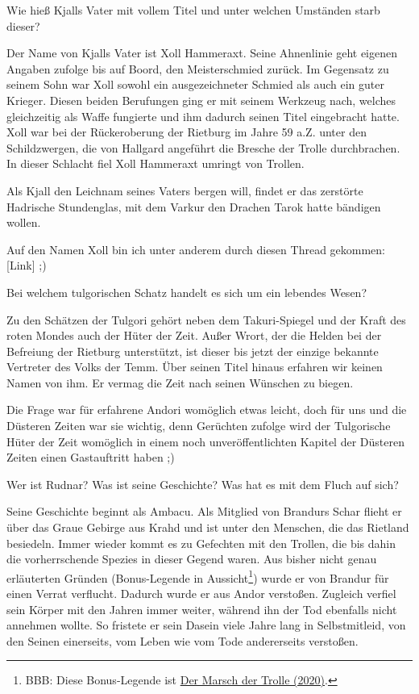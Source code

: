 \documentclass[10pt, a4paper, oneside]{book}
\newcommand{\reflegende}[1]{\hyperref[Legende: #1]{#1}}
\begin{document}
\begin{multicols}{2}
Wie hieß Kjalls Vater mit vollem Titel und unter welchen Umständen starb dieser?\bigskip

Der Name von Kjalls Vater ist Xoll Hammeraxt. Seine Ahnenlinie geht eigenen Angaben zufolge bis auf Boord, den Meisterschmied zurück. Im Gegensatz zu seinem Sohn war Xoll sowohl ein ausgezeichneter Schmied als auch ein guter Krieger. Diesen beiden Berufungen ging er mit seinem Werkzeug nach, welches gleichzeitig als Waffe fungierte und ihm dadurch seinen Titel eingebracht hatte. Xoll war bei der Rückeroberung der Rietburg im Jahre 59 a.Z. unter den Schildzwergen, die von Hallgard angeführt die Bresche der Trolle durchbrachen. In dieser Schlacht fiel Xoll Hammeraxt umringt von Trollen.

Als Kjall den Leichnam seines Vaters bergen will, findet er das zerstörte Hadrische Stundenglas, mit dem Varkur den Drachen Tarok hatte bändigen wollen.

Auf den Namen Xoll bin ich unter anderem durch diesen Thread gekommen: [Link] ;)\bigskip

Bei welchem tulgorischen Schatz handelt es sich um ein lebendes Wesen?\bigskip

Zu den Schätzen der Tulgori gehört neben dem Takuri-Spiegel und der Kraft des roten Mondes auch der Hüter der Zeit. Außer Wrort, der die Helden bei der Befreiung der Rietburg unterstützt, ist dieser bis jetzt der einzige bekannte Vertreter des Volks der Temm. Über seinen Titel hinaus erfahren wir keinen Namen von ihm. Er vermag die Zeit nach seinen Wünschen zu biegen.

Die Frage war für erfahrene Andori womöglich etwas leicht, doch für uns und die Düsteren Zeiten war sie wichtig, denn Gerüchten zufolge wird der Tulgorische Hüter der Zeit womöglich in einem noch unveröffentlichten Kapitel der Düsteren Zeiten einen Gastauftritt haben ;)\bigskip

Wer ist Rudnar? Was ist seine Geschichte? Was hat es mit dem Fluch auf sich?\bigskip

Seine Geschichte beginnt als Ambacu. Als Mitglied von Brandurs Schar flieht er über das Graue Gebirge aus Krahd und ist unter den Menschen, die das Rietland besiedeln. Immer wieder kommt es zu Gefechten mit den Trollen, die bis dahin die vorherrschende Spezies in dieser Gegend waren. Aus bisher nicht genau erläuterten Gründen (Bonus-Legende in Aussicht\footnote{BBB: Diese Bonus-Legende ist \reflegende{Der Marsch der Trolle (2020)}.}) wurde er von Brandur für einen Verrat verflucht. Dadurch wurde er aus Andor verstoßen. Zugleich verfiel sein Körper mit den Jahren immer weiter, während ihn der Tod ebenfalls nicht annehmen wollte. So fristete er sein Dasein viele Jahre lang in Selbstmitleid, von den Seinen einerseits, vom Leben wie vom Tode andererseits verstoßen.


\end{multicols}
\end{document}
